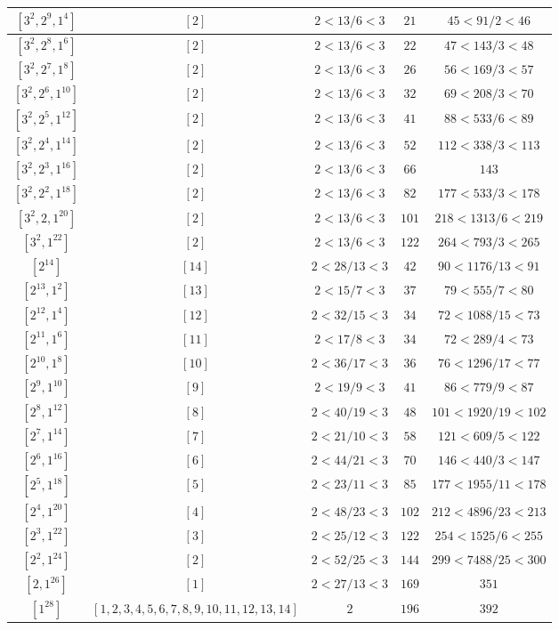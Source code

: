\documentclass{article}%
\begin{document}
\begin{center}
\begin{longtable}{||c|c|c|c|c||}
$[3^{2}, 2^{9}, 1^{4}]$ & $[2]$ & $2 < 13/6 < 3$ & $21$ & $45 < 91/2 < 46$ \\ \hline 
$[3^{2}, 2^{8}, 1^{6}]$ & $[2]$ & $2 < 13/6 < 3$ & $22$ & $47 < 143/3 < 48$ \\ \hline 
$[3^{2}, 2^{7}, 1^{8}]$ & $[2]$ & $2 < 13/6 < 3$ & $26$ & $56 < 169/3 < 57$ \\ \hline 
$[3^{2}, 2^{6}, 1^{10}]$ & $[2]$ & $2 < 13/6 < 3$ & $32$ & $69 < 208/3 < 70$ \\ \hline 
$[3^{2}, 2^{5}, 1^{12}]$ & $[2]$ & $2 < 13/6 < 3$ & $41$ & $88 < 533/6 < 89$ \\ \hline 
$[3^{2}, 2^{4}, 1^{14}]$ & $[2]$ & $2 < 13/6 < 3$ & $52$ & $112 < 338/3 < 113$ \\ \hline 
$[3^{2}, 2^{3}, 1^{16}]$ & $[2]$ & $2 < 13/6 < 3$ & $66$ & $143$ \\ \hline 
$[3^{2}, 2^{2}, 1^{18}]$ & $[2]$ & $2 < 13/6 < 3$ & $82$ & $177 < 533/3 < 178$ \\ \hline 
$[3^{2}, 2, 1^{20}]$ & $[2]$ & $2 < 13/6 < 3$ & $101$ & $218 < 1313/6 < 219$ \\ \hline 
$[3^{2}, 1^{22}]$ & $[2]$ & $2 < 13/6 < 3$ & $122$ & $264 < 793/3 < 265$ \\ \hline 
$[2^{14}]$ & $[14]$ & $2 < 28/13 < 3$ & $42$ & $90 < 1176/13 < 91$ \\ \hline 
$[2^{13}, 1^{2}]$ & $[13]$ & $2 < 15/7 < 3$ & $37$ & $79 < 555/7 < 80$ \\ \hline 
$[2^{12}, 1^{4}]$ & $[12]$ & $2 < 32/15 < 3$ & $34$ & $72 < 1088/15 < 73$ \\ \hline 
$[2^{11}, 1^{6}]$ & $[11]$ & $2 < 17/8 < 3$ & $34$ & $72 < 289/4 < 73$ \\ \hline 
$[2^{10}, 1^{8}]$ & $[10]$ & $2 < 36/17 < 3$ & $36$ & $76 < 1296/17 < 77$ \\ \hline 
$[2^{9}, 1^{10}]$ & $[9]$ & $2 < 19/9 < 3$ & $41$ & $86 < 779/9 < 87$ \\ \hline 
$[2^{8}, 1^{12}]$ & $[8]$ & $2 < 40/19 < 3$ & $48$ & $101 < 1920/19 < 102$ \\ \hline 
$[2^{7}, 1^{14}]$ & $[7]$ & $2 < 21/10 < 3$ & $58$ & $121 < 609/5 < 122$ \\ \hline 
$[2^{6}, 1^{16}]$ & $[6]$ & $2 < 44/21 < 3$ & $70$ & $146 < 440/3 < 147$ \\ \hline 
$[2^{5}, 1^{18}]$ & $[5]$ & $2 < 23/11 < 3$ & $85$ & $177 < 1955/11 < 178$ \\ \hline 
$[2^{4}, 1^{20}]$ & $[4]$ & $2 < 48/23 < 3$ & $102$ & $212 < 4896/23 < 213$ \\ \hline 
$[2^{3}, 1^{22}]$ & $[3]$ & $2 < 25/12 < 3$ & $122$ & $254 < 1525/6 < 255$ \\ \hline 
$[2^{2}, 1^{24}]$ & $[2]$ & $2 < 52/25 < 3$ & $144$ & $299 < 7488/25 < 300$ \\ \hline 
$[2, 1^{26}]$ & $[1]$ & $2 < 27/13 < 3$ & $169$ & $351$ \\ \hline 
$[1^{28}]$ & $[1, 2, 3, 4, 5, 6, 7, 8, 9, 10, 11, 12, 13, 14]$ & $2$ & $196$ & $392$ \\ \hline 
    \end{longtable}
    \end{center}
\newpage
\end{document}
